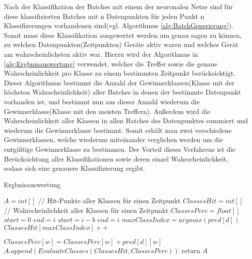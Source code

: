     Nach der Klassifikation der Batches mit einem der neuronalen Netze sind für diese klassifizierten Batches mit n Datenpunkten für jeden Punkt n Klassifizerungen vorhandenen sind(vgl. Algorithmus \ref{alg:BatchGenerierung}).
    Somit muss diese Klassifikation ausgewertet werden um genau sagen zu können, zu welchen Datenpunkten(Zeitpunkten) Geräte aktiv waren und welches Gerät am wahrscheinlichsten aktiv war.
    Hierzu wird der Algorithmus in \ref{alg:Ergbnisauswertung} verwendet, welcher die Treffer sowie die genaue Wahrscheinlichkeit pro Klasse zu einem bestimmten Zeitpunkt berücksichtigt. 
    Dieser Algorithmus bestimmt die Anzahl der Gewinnerklassen(Klasse mit der höchsten Wahrscheinlichkeit) aller Batches in denen der bestimmte Datenpunkt vorhanden ist, und bestimmt nun aus dieser Anzahl wiederum die Gewinnerklasse(Klasse mit den meisten Treffern).
    Außerdem wird die Wahrscheinlichkeit aller Klassen in allen Batches des Datenpunktes summiert und wiederum die Gewinnerklasse bestimmt.
    Somit erhält man zwei verschiedene Gewinnerklassen, welche wiederum miteinander verglichen werden um die entgültige Gewinnerklasse zu bestimmen.
    \newline
    \noindent
    Der Vorteil dieses Verfahrens ist die Berücksichtung aller Klassifikationen sowie deren einzel Wahrscheinlichkeit, sodass sich eine genauere Klassifizierung ergibt.
    \begin{algorithm}\label{alg:Ergbnisauswertung}
        \caption{Ergbnisauswertung}
        \begin{algorithmic}[1]
            \State {}
            \State
            \State ${A} = int[ ]$
                \State
                \State // Hit-Punkte aller Klassen für einen Zeitpunkt
                \State $ClassesHit = int[ ]$
                \State // Wahrscheinlichkeit aller Klassen für einen Zeitpunkt
                \State $ClassesPerc = float[ ]$
                \State
                    \State $start = 0$
                    \State $end = i$
                \Else
                    \State $start = i - b$
                    \State $end = i$
                \EndIf
                \State
                    \State $maxClassIndex = argmax(pred[d])$
                    \State $ClassesHit[maxClassIndex]++$

                        \State $ClassesPerc[w] = ClassesPerc[w] + pred[d][w]$
                    \EndFor
                \EndFor
                \State
                \State $A.append(EvaluateClasses(ClassesHit, ClassesPerc))$
                \State
            \EndFor
            \State return $A$
        \EndFunction
        \end{algorithmic}
    \end{algorithm}
